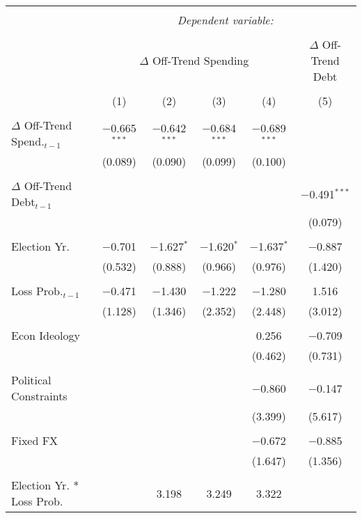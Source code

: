 
\begingroup 
\tiny 
\begin{tabular}{@{\extracolsep{5pt}}lccccc} 
\\[-1.8ex]\hline 
\hline \\[-1.8ex] 
 & \multicolumn{5}{c}{\textit{Dependent variable:}} \\ 
\cline{2-6} 
\\[-1.8ex] & \multicolumn{4}{c}{$\Delta$ Off-Trend Spending} & $\Delta$ Off-Trend Debt \\ 
\\[-1.8ex] & (1) & (2) & (3) & (4) & (5)\\ 
\hline \\[-1.8ex] 
 $\Delta$ Off-Trend Spend.$_{t-1}$ & $-$0.665$^{***}$ & $-$0.642$^{***}$ & $-$0.684$^{***}$ & $-$0.689$^{***}$ &  \\ 
  & (0.089) & (0.090) & (0.099) & (0.100) &  \\ 
  & & & & & \\ 
 $\Delta$ Off-Trend Debt$_{t-1}$ &  &  &  &  & $-$0.491$^{***}$ \\ 
  &  &  &  &  & (0.079) \\ 
  & & & & & \\ 
 Election Yr. & $-$0.701 & $-$1.627$^{*}$ & $-$1.620$^{*}$ & $-$1.637$^{*}$ & $-$0.887 \\ 
  & (0.532) & (0.888) & (0.966) & (0.976) & (1.420) \\ 
  & & & & & \\ 
 Loss Prob.$_{t-1}$ & $-$0.471 & $-$1.430 & $-$1.222 & $-$1.280 & 1.516 \\ 
  & (1.128) & (1.346) & (2.352) & (2.448) & (3.012) \\ 
  & & & & & \\ 
 Econ Ideology &  &  &  & 0.256 & $-$0.709 \\ 
  &  &  &  & (0.462) & (0.731) \\ 
  & & & & & \\ 
 Political Constraints &  &  &  & $-$0.860 & $-$0.147 \\ 
  &  &  &  & (3.399) & (5.617) \\ 
  & & & & & \\ 
 Fixed FX &  &  &  & $-$0.672 & $-$0.885 \\ 
  &  &  &  & (1.647) & (1.356) \\ 
  & & & & & \\ 
 Election Yr. * Loss Prob. &  & 3.198 & 3.249 & 3.322 &  \\ 

\end{tabular}
